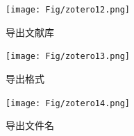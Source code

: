 \begin{figure}[htbp]
	\centering
	\texttt{[image: Fig/zotero12.png]}
	\caption{\label{output}导出文献库}
\end{figure}

\begin{figure}[htbp]
	\centering
	\texttt{[image: Fig/zotero13.png]}
	\caption{\label{output_format}导出格式}
\end{figure}

\begin{figure}[htbp]
	\centering
	\texttt{[image: Fig/zotero14.png]}
	\caption{\label{output_name}导出文件名}
\end{figure}









